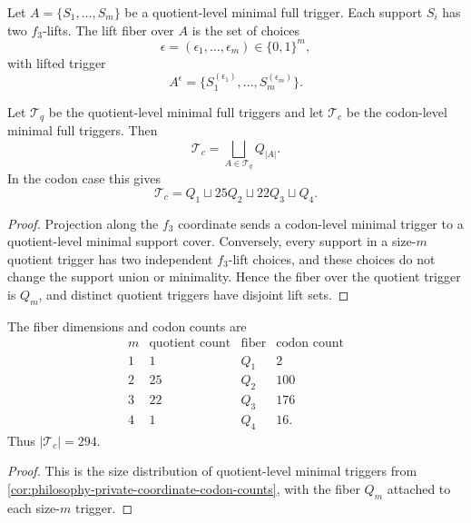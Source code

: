 \begin{definition}
\label{def:philosophy-minimal-trigger-lift-fiber}
Let $A=\{S_{1},\ldots,S_{m}\}$ be a quotient-level minimal full trigger.
Each support $S_{i}$ has two $f_{3}$-lifts. The lift fiber over $A$ is
the set of choices
$$
  \epsilon=(\epsilon_{1},\ldots,\epsilon_{m})\in\{0,1\}^{m},
$$
with lifted trigger
$$
  A^{\epsilon}
  =
  \{S_{1}^{(\epsilon_{1})},\ldots,S_{m}^{(\epsilon_{m})}\}.
$$
\end{definition}

\begin{theorem}
\label{thm:philosophy-minimal-trigger-lift-bundle-decomposition}
Let $\mathcal{T}_{q}$ be the quotient-level minimal full triggers and
let $\mathcal{T}_{c}$ be the codon-level minimal full triggers. Then
$$
  \mathcal{T}_{c}
  =
  \bigsqcup_{A\in\mathcal{T}_{q}}Q_{|A|}.
$$
In the codon case this gives
$$
  \mathcal{T}_{c}
  =
  Q_{1}
  \sqcup
  25Q_{2}
  \sqcup
  22Q_{3}
  \sqcup
  Q_{4}.
$$
\end{theorem}
\begin{proof}
Projection along the $f_{3}$ coordinate sends a codon-level minimal
trigger to a quotient-level minimal support cover. Conversely, every
support in a size-$m$ quotient trigger has two independent $f_{3}$-lift
choices, and these choices do not change the support union or
minimality. Hence the fiber over the quotient trigger is $Q_{m}$, and
distinct quotient triggers have disjoint lift sets.
\end{proof}


\begin{corollary}
\label{cor:philosophy-minimal-trigger-lift-fiber-distribution}
The fiber dimensions and codon counts are
$$
\begin{array}{c|r|c|r}
  m & \text{quotient count} & \text{fiber} & \text{codon count}\\
  \hline
  1 & 1 & Q_{1} & 2\\
  2 & 25 & Q_{2} & 100\\
  3 & 22 & Q_{3} & 176\\
  4 & 1 & Q_{4} & 16.
\end{array}
$$
Thus $|\mathcal{T}_{c}|=294$.
\end{corollary}
\begin{proof}
This is the size distribution of quotient-level minimal triggers from
\autoref{cor:philosophy-private-coordinate-codon-counts}, with the
fiber $Q_{m}$ attached to each size-$m$ trigger.
\end{proof}

